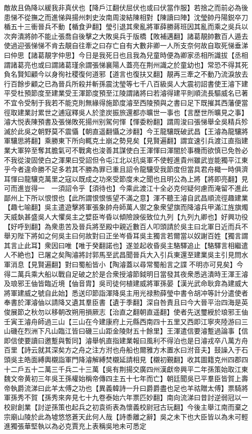 敵故且偽降以緩我非真伏也【降戶江翻伏屈伏也或曰伏當作服】若捨之而前必為後患悌不從撫之而進悌與揚州刺史汝南周浚結陳相對【陳讀曰陣】沈瑩帥丹陽鋭卒刀楯五十三衝晉兵不動【楯食尹翻】瑩引退其衆亂將軍薛勝蔣班因其亂而乘之吳兵以次奔潰將帥不能止張喬自後擊之大敗吳兵于版橋【敗補邁翻】諸葛靚帥數百人遁去使過迎張悌悌不肯去靚自往牽之曰存亡自有大數非卿一人所支奈何故自取死悌垂涕曰仲思【諸葛靚字仲思】今日是我死日也且我為兒童時便為卿家丞相所識拔【丞相謂諸葛亮也或曰謂諸葛瑾余謂張悌襄陽人蓋亮在荆州識之於童幼也】常恐不得其死負名賢知顧今以身徇社稷復何道邪【道言也復扶又翻】靚再三牽之不動乃流淚放去行百餘步顧之已為晉兵所殺并斬孫震沈瑩等七千八百級吳人大震初詔書使王濬下建平受杜預節度至建業受王渾節度預至江陵謂諸將曰若濬得建平則順流長驅威名已著不宜令受制于我若不能克則無緣得施節度濬至西陵預與之書曰足下既摧其西藩便當徑取建業討累世之逋寇釋吳人於塗炭振旅還都亦曠世一事也【言歷世所曠見之事】濬大悦表陳預書及張悌敗死揚州别駕何惲【惲委粉翻】謂周浚曰張悌舉全吳精兵殄滅於此吳之朝野莫不震懾【朝直遥翻懾之涉翻】今王龍驤既破武昌【王濬為龍驤將軍驤思將翻】乘勝東下所向輒克土崩之勢見矣【見賢遍翻】謂宜速引兵渡江直指建業大軍猝至奪其膽氣可不戰禽也浚善其謀使白王渾惲曰渾闇於事機而欲慎已免咎必不我從浚固使白之渾果曰受詔但令屯江北以抗吳軍不使輕進貴州雖武豈能獨平江東乎今者違命勝不足多若其不勝為罪已重且詔令龍驤受我節度但當具君舟檝一時俱濟耳惲曰龍驤克萬里之寇以既成之功來受節度未之聞也且明公為上將【將即亮翻】見可而進豈得一　一須詔令乎【須待也】今乘此渡江十全必克何疑何慮而淹留不進此鄙州上下所以恨恨也【此所謂恨恨悵望不滿之意】渾不聽王濬自武昌順流徑趣建業【趣七喻翻】吳主遣遊擊將軍張象帥舟師萬人禦之象衆望旗而降濬兵甲滿江旌旗燭天威埶甚盛吳人大懼吳主之嬖臣岑昏以傾險諛佞致位九列【九列九卿也】好興功役【好呼到翻】為衆患苦及晉兵將至殿中親近數百人叩頭請於吳主曰北軍日近而兵不舉刃陛下將如之何吳主曰何故對曰正坐岑昏耳吳主獨言若爾當以奴謝百姓【獨言謂其言止此耳】衆因曰唯【唯于癸翻諾也】遂並起收昏吳主駱驛追止【駱驛言相繼遣人不絶也】已屠之矣陶濬將討郭馬至武昌聞晉兵大入引兵東還至建業吳主引見問水軍消息【見賢遍翻】對曰蜀船皆小【陶濬蓋以尋常蜀船言之諜不明亦可見矣】今得二萬兵乘大船以戰自足破之於是合衆授濬節鉞明日當發其夜衆悉逃潰時王渾王濬及琅邪王伷皆臨近境【伷音胄】吳司徒何植建威將軍孫晏【漢光武命耿弇為建威大將軍建威之號自此始】悉送印節詣渾降吳主用光禄勲薛瑩中書令胡冲等計分遣使者奉書於渾濬伷以請降又遺其羣臣書【遺于季翻】深自咎責且曰今大晉平治四海是英俊展節之秋勿以移朝改朔用損厥志【治直之翻朝直遥翻】使者先送璽綬於琅邪王伷壬寅王濬舟師過三山【三山在今建康府上元縣西南四十五里又西即江寧夾陸游曰三山磯在烈洲下凡山臨江皆曰磯三山距金陵財五十餘里】王渾遣信要濬蹔過論事【信即信使要讀曰邀蹔與暫同】濬舉帆直指建業報曰風利不得泊也是日濬戎卒八萬方舟百里【詩云就其深矣方之舟之注方泭也舟船也爾雅方木置水曰泭音夫】鼓譟入于石頭吳主皓面縛輿櫬詣軍門降濬解縛焚櫬延請相見【櫬初覲翻】收其圖籍克州四郡四十二戶五十二萬三千兵二十三萬【吳有荆揚交廣四州漢獻帝興平二年孫策始取江東魏文帝黄初三年吳王孫權始稱帝傳四主五十七年而亡】朝廷聞吳已平羣臣皆賀上壽帝執爵流涕曰此羊太傅之功也【異義韓詩一升曰爵爵盡也足也羊祜贈太傅】票騎將軍孫秀不賀【孫秀來奔見七十九卷泰始六年票匹妙翻】南向流涕曰昔討逆弱冠以一校尉創業【討逆孫策也起兵之初袁術表為懷義校尉冠古玩翻】今後主舉江南而棄之宗廟山陵於此為墟悠悠蒼天此何人哉【詩黍離之辭】吳之未下也大臣皆以為未可輕進獨張華堅執以為必克賈充上表稱吳地未可悉定